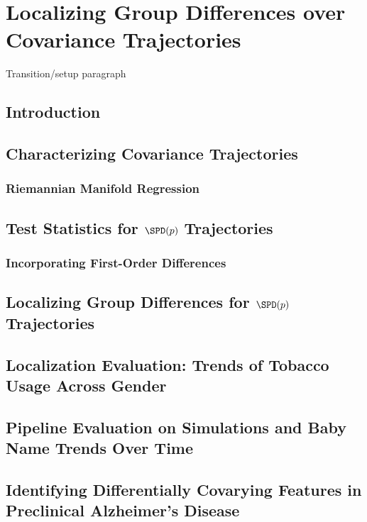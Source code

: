 \chapter{Localizing Group Differences over
Covariance Trajectories}\label{sec:covtraj}

Transition/setup paragraph

\section{Introduction}

\section{Characterizing Covariance Trajectories}
\label{sec:mglm}

\subsection{Riemannian Manifold Regression}

\section{Test Statistics for $\SPD(p)$ Trajectories}
\label{sec:hyp-test}

\subsection{Incorporating First-Order Differences}

\section{Localizing Group Differences for $\SPD(p)$ Trajectories}
\label{sec:loc}

\section{Localization Evaluation: Trends of Tobacco Usage Across Gender}
\label{sec:loceval}

\section{Pipeline Evaluation on Simulations and Baby Name Trends Over Time}
\label{sec:pipeval}

\section{Identifying Differentially Covarying Features in Preclinical Alzheimer's Disease}
\label{sec:wrap}

